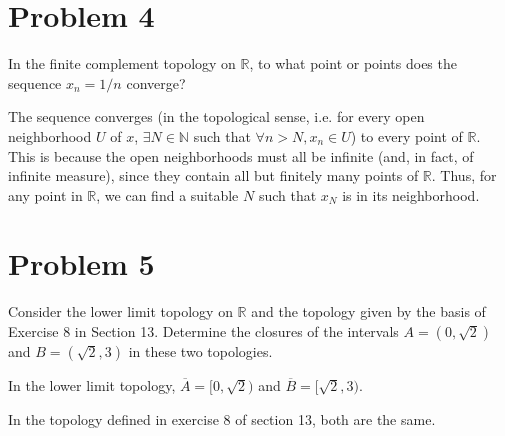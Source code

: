 \documentclass[11pt]{article}
\begin{document}
\section{Problem 4}
\label{sec:org1a1cbe3}
In the finite complement topology on \(\mathbb{R}\), to what point or
points does the sequence \(x_n = 1/n\) converge? 

The sequence converges (in the topological sense, i.e. for every open
neighborhood \(U\) of \(x\), \(\exists N \in \mathbb{N}\) such that \(\forall
n > N, x_n \in U\)) to every point of \(\mathbb{R}\). This is because the
open neighborhoods must all be infinite (and, in fact, of infinite
measure), since they contain all but finitely many points of
\(\mathbb{R}\). Thus, for any point in \(\mathbb{R}\), we can find a
suitable \(N\) such that \(x_N\) is in its neighborhood.

\section{Problem 5}
\label{sec:org799cb9b}
Consider the lower limit topology on \(\mathbb{R}\) and the topology
given by the basis of Exercise 8 in Section 13. Determine the closures
of the intervals \(A = (0, \sqrt{2})\) and \(B = (\sqrt{2}, 3)\) in these
two topologies.

In the lower limit topology, \(\overline{A} = [0, \sqrt{2})\) and
\(\overline{B} = [\sqrt{2}, 3)\). 

In the topology defined in exercise 8 of section 13, both are the
same.
\end{document}
